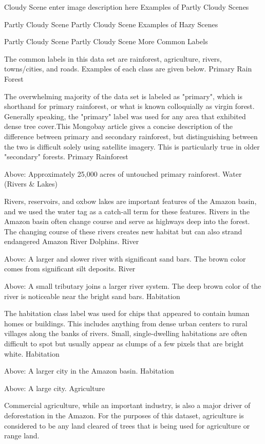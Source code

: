 Cloudy Scene enter image description here
Examples of Partly Cloudy Scenes

Partly Cloudy Scene Partly Cloudy Scene
Examples of Hazy Scenes

Partly Cloudy Scene Partly Cloudy Scene
More Common Labels

The common labels in this data set are rainforest, agriculture, rivers, towns/cities, and roads. Examples of each class are given below.
Primary Rain Forest

The overwhelming majority of the data set is labeled as "primary", which is shorthand for primary rainforest, or what is known colloquially as virgin forest. Generally speaking, the "primary" label was used for any area that exhibited dense tree cover.This Mongobay article gives a concise description of the difference between primary and secondary rainforest, but distinguishing between the two is difficult solely using satellite imagery. This is particularly true in older "secondary" forests. Primary Rainforest

Above: Approximately 25,000 acres of untouched primary rainforest.
Water (Rivers & Lakes)

Rivers, reservoirs, and oxbow lakes are important features of the Amazon basin, and we used the water tag as a catch-all term for these features. Rivers in the Amazon basin often change course and serve as highways deep into the forest. The changing course of these rivers creates new habitat but can also strand endangered Amazon River Dolphins. River

Above: A larger and slower river with significant sand bars. The brown color comes from significant silt deposits. River

Above: A small tributary joins a larger river system. The deep brown color of the river is noticeable near the bright sand bars.
Habitation

The habitation class label was used for chips that appeared to contain human homes or buildings. This includes anything from dense urban centers to rural villages along the banks of rivers. Small, single-dwelling habitations are often difficult to spot but usually appear as clumps of a few pixels that are bright white. Habitation

Above: A larger city in the Amazon basin. Habitation

Above: A large city.
Agriculture

Commercial agriculture, while an important industry, is also a major driver of deforestation in the Amazon. For the purposes of this dataset, agriculture is considered to be any land cleared of trees that is being used for agriculture or range land.

